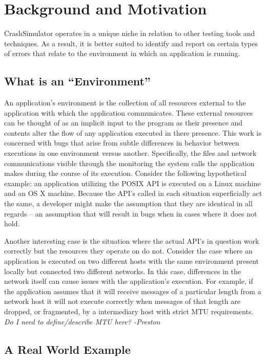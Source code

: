 \section{Background and Motivation}

CrashSimulator operates in a unique niche in relation to other testing tools and techniques. As a result, it is better
suited to identify and report on certain types of errors that relate to the environment in which an application is
running.

    \subsection{What is an ``Environment''}

    An application's environment is the collection of all resources external to the application with which the
    application communicates.  These external resources can be thought of as an implicit input to the program as their
    presence and contents alter the flow of any application executed in there presence.  This work is concerned with bugs
    that arise from subtle differences in behavior between executions in one environment versus another. Specifically, the
    files and network communications visible through the monitoring the system calls the application makes during the course
    of its execution.  Consider the following hypothetical example: an application utilizing the POSIX API is executed on a
    Linux machine and an OS X machine.  Because the API's called in each situation superficially act the same, a developer might
    make the assumption that they are identical in all regards -- an assumption that will result in bugs when in cases where
    it does not hold.

    Another interesting case is the situation where the actual API's in question work correctly but the resources they
    operate on do not.  Consider the case where an application is executed on two different hosts with the same environment
    present locally but connected two different networks.  In this case, differences in the network itself can cause issues
    with the application's execution.  For example, if the application assumes that it will receive messages of a particular
    length from a network host it will not execute correctly when messages of that length are dropped, or fragmented, by a
    intermediary host with strict MTU requirements. \emph{Do I need to define/describe MTU here? -Preston}

    \subsection{A Real World Example}

